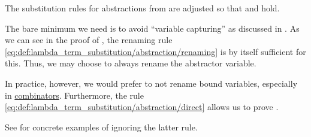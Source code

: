 \begin{remark}\label{rem:renaming_substitution_rules}
  The substitution rules for abstractions from  are adjusted so that  and  hold.

  The bare minimum we need is to avoid \enquote{variable capturing} as discussed in . As we can see in the proof of , the renaming rule \eqref{eq:def:lambda_term_substitution/abstraction/renaming} is by itself sufficient for this. Thus, we may choose to always rename the abstractor variable.

  In practice, however, we would prefer to not rename bound variables, especially in \hyperref[def:lambda_combinator]{combinators}. Furthermore, the rule \eqref{eq:def:lambda_term_substitution/abstraction/direct} allows us to prove .

  See  for concrete examples of ignoring the latter rule.
\end{remark}

